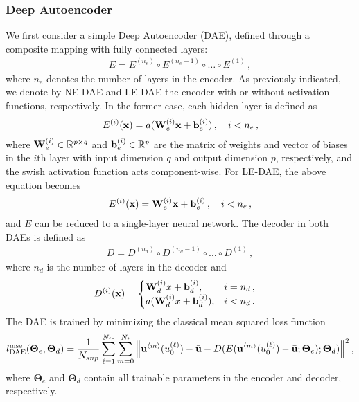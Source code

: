\subsubsection{Deep Autoencoder}\label{sec: shallow autoencoder}
We first consider a simple Deep Autoencoder (DAE), defined through a composite mapping with fully connected layers:
\begin{align}
    E = E^{(n_e)} \circ E^{(n_e -1)} \circ \ldots \circ E^{(1)}\,, 
\end{align}
where $n_e$ denotes the number of layers in the encoder. As previously indicated, we denote by NE-DAE and LE-DAE the encoder with or without activation functions, respectively. In the former case, each hidden layer is defined as
\begin{align}
    E^{(i)}(\textbf{x}) = a(\textbf{W}_e^{(i)} \textbf{x} + \textbf{b}_e^{(i)})\,, \quad i < n_e\,,
\end{align}
where $\textbf{W}_e^{(i)} \in \mathbb{R}^{p \times q}$ and $\textbf{b}_e^{(i)} \in \mathbb{R}^{p}$ are the matrix of weights and vector of biases in the $i$th layer with input dimension $q$ and output dimension $p$, respectively, and the swish activation function acts component-wise. For LE-DAE, the above equation becomes
\begin{align}\label{eq: hidden layer}
    E^{(i)}(\textbf{x}) = \textbf{W}_e^{(i)} \textbf{x} + \textbf{b}_e^{(i)}\,,\quad i < n_e\,,
\end{align}
and $E$ can be reduced to a single-layer neural network. The decoder in both DAEs is defined as
\begin{align}
    D = D^{(n_d)} \circ D^{(n_d -1)} \circ \ldots \circ D^{(1)}\,,
\end{align}
where $n_d$ is the number of layers in the decoder and
\begin{align}
    D^{(i)}(\textbf{x}) & = 
    \begin{cases} 
        \textbf{W}_d^{(i)} x + \textbf{b}_d^{(i)}, & i = n_d\,,\\
        a(\textbf{W}_d^{(i)} x + \textbf{b}_d^{(i)}), & i < n_d\,.
    \end{cases}
\end{align}
The DAE is trained by minimizing the classical mean squared loss function
\begin{align}\label{eq: mse}
    l^{\text{mse}}_{\text{DAE}}(\boldsymbol{\Theta}_e, \boldsymbol{\Theta}_d) = \frac{1}{N_{snp}} \sum_{\ell = 1}^{N_{ic}} \sum_{m=0}^{N_t}{\left\lVert\textbf{u}^{\left<m\right>}(u_0^{(\ell)}) - \bar{\textbf{u}} - D(E(\textbf{u}^{\left<m\right>}(u_0^{(\ell)})-\bar{\textbf{u}}; \boldsymbol{\Theta}_e); \boldsymbol{\Theta}_d)\right\rVert}^2\,,
\end{align}
where $\boldsymbol{\Theta}_e$ and $\boldsymbol{\Theta}_d$ contain all trainable parameters in the encoder and decoder, respectively.

